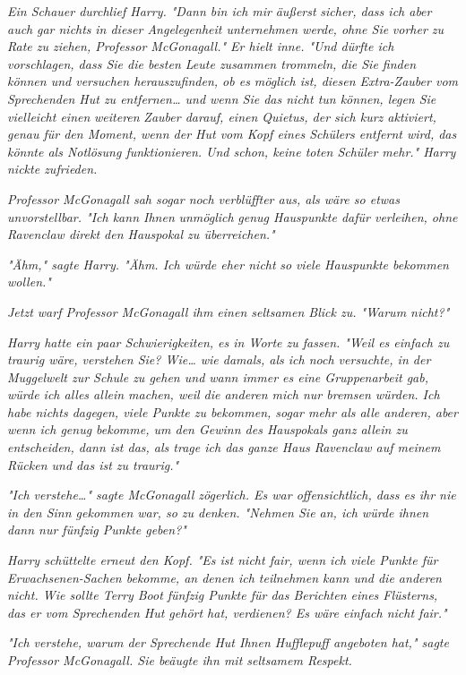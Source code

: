 {\emph{Ein Schauer durchlief Harry. "Dann bin ich mir} \emph{\emph{äußerst}} \emph{sicher, dass ich aber auch} \emph{\emph{gar nichts}} \emph{in dieser Angelegenheit unternehmen werde, ohne Sie} \emph{vorher zu Rate zu ziehen, Professor McGonagall." Er hielt inne. "Und dürfte ich vorschlagen, dass Sie die besten Leute zusammen trommeln, die Sie finden können und versuchen herauszufinden, ob es möglich ist, diesen Extra-Zauber vom Sprechenden Hut zu entfernen… und wenn Sie das nicht tun können, legen Sie vielleicht einen} \emph{\emph{weiteren}} \emph{Zauber darauf, einen Quietus, der sich kurz aktiviert, genau für den Moment, wenn der Hut vom Kopf eines Schülers entfernt wird, das könnte als Notlösung funktionieren. Und schon, keine toten Schüler mehr." Harry nickte zufrieden.}

\emph{Professor McGonagall sah sogar noch verblüffter aus, als wäre so etwas unvorstellbar. "Ich kann Ihnen} \emph{\emph{unmöglich}} \emph{genug Hauspunkte dafür verleihen, ohne Ravenclaw direkt den Hauspokal zu überreichen."}

\emph{"Ähm," sagte Harry. "Ähm. Ich würde eher nicht} \emph{\emph{so}} \emph{viele Hauspunkte bekommen wollen."}

\emph{Jetzt warf Professor McGonagall ihm einen seltsamen Blick zu. "Warum nicht?"}

\emph{Harry hatte ein paar Schwierigkeiten, es in Worte zu fassen. "Weil es einfach zu traurig wäre, verstehen Sie? Wie… wie damals, als ich noch versuchte, in der Muggelwelt zur Schule zu gehen und wann immer es eine Gruppenarbeit gab, würde ich alles allein machen, weil die anderen mich nur bremsen würden. Ich habe nichts dagegen, viele Punkte zu bekommen, sogar mehr als alle anderen, aber wenn ich genug bekomme, um den Gewinn des Hauspokals ganz allein zu entscheiden, dann ist das, als trage ich das ganze Haus Ravenclaw auf meinem Rücken und das ist zu traurig."}

\emph{"Ich verstehe…" sagte McGonagall zögerlich. Es war offensichtlich, dass es ihr nie in den Sinn gekommen war, so zu denken. "Nehmen Sie an, ich würde ihnen dann nur fünfzig Punkte geben?"}

\emph{Harry schüttelte erneut den Kopf. "Es ist nicht fair, wenn ich viele Punkte für Erwachsenen-Sachen bekomme, an denen ich teilnehmen kann und die anderen nicht. Wie sollte Terry Boot fünfzig Punkte für das Berichten eines Flüsterns, das er vom Sprechenden Hut gehört hat, verdienen? Es wäre einfach nicht fair."}

\emph{"Ich verstehe, warum der Sprechende Hut Ihnen Hufflepuff angeboten hat," sagte Professor McGonagall. Sie beäugte ihn mit seltsamem Respekt.}

}
